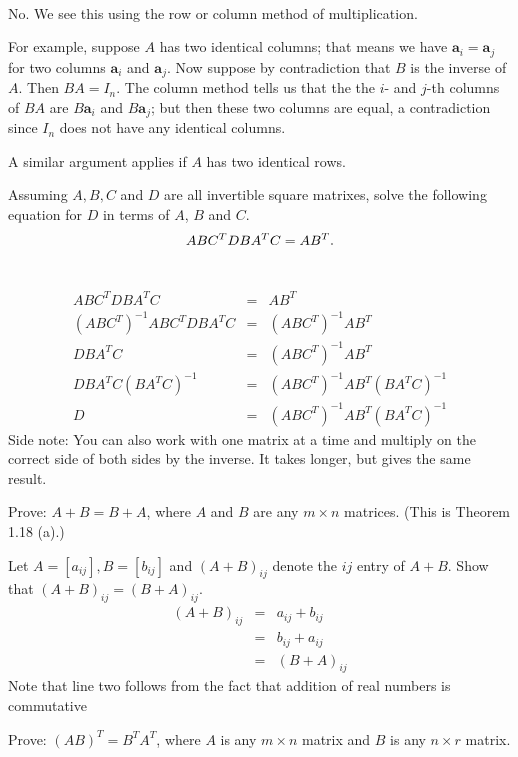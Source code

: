 \\
\begin{solution}
\noindent
No. We see this using the row or column method of multiplication. 

For example, suppose $A$ has two identical columns; that means we have $\mathbf{a}_{i}=\mathbf{a}_{j}$ for two columns $\mathbf{a}_{i}$ and $\mathbf{a}_{j}$.  Now suppose by contradiction that $B$ is the inverse of $A$. Then $BA=I_n$. The column method tells us that the the $i$- and $j$-th columns of $BA$ are $B\mathbf{a}_{i}$ and $B\mathbf{a}_{j}$; but then these two columns are equal, a contradiction since $I_n$ does not have any identical columns. 

A similar argument applies if $A$ has two identical rows. 
\end{solution}
\ii Assuming $A, B, C$ and $D$ are all invertible square matrixes, solve the following equation for $D$ in terms of $A$, $B$ and $C$.
\[
ABC^TDBA^TC=AB^T.\\
\]
\ \\
\begin{solution}
\begin{eqnarray*}
ABC^TDBA^TC&=&AB^T\\
(ABC^T)^{-1}ABC^TDBA^TC&=&(ABC^T)^{-1}AB^T\\
DBA^TC&=&(ABC^T)^{-1}AB^T\\
DBA^TC(BA^TC)^{-1}&=&(ABC^T)^{-1}AB^T(BA^TC)^{-1}\\
D&=&(ABC^T)^{-1}AB^T(BA^TC)^{-1}
\end{eqnarray*}
Side note: You can also work with one matrix at a time and multiply on the correct side of both sides by the inverse. It takes longer, but gives the same result.
\end{solution}
\ii Prove: $A+B=B+A$, where $A$ and $B$ are any $m\times n$ matrices. (This is Theorem 1.18 (a).) 
\\
\begin{solution}
\noindent
Let $A = [a_{ij}], B = [b_{ij}]$ and $(A+B)_{ij}$ denote the $ij$ entry of $A+B$. Show that $(A+B)_{ij} = (B+A)_{ij}$.
\begin{eqnarray*}
(A+B)_{ij} &=& a_{ij} + b_{ij}\\
&=& b_{ij} + a_{ij}\\
&=& (B+A)_{ij}
\end{eqnarray*}
Note that line two follows from the fact that addition of real numbers is commutative
\end{solution}
\ii Prove: $(AB)^T = B^TA^T$, where $A$ is any $m\times n$ matrix and $B$ is any $n\times r$ matrix.  
